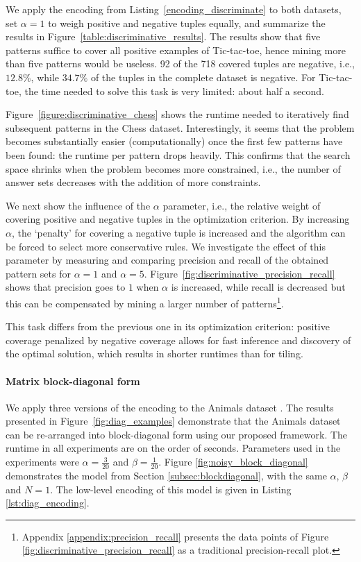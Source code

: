 We apply the encoding from Listing~\ref{encoding_discriminate} to both datasets, set $\alpha = 1$ to weigh positive and negative tuples equally, and summarize the results in Figure~\ref{table:discriminative_results}. The results show that five patterns suffice to cover all positive examples of Tic-tac-toe, hence mining more than five patterns would be useless. 92 of the 718 covered tuples are negative, i.e., $12.8\%$, while $34.7\%$ of the tuples in the complete dataset is negative. For Tic-tac-toe, the time needed to solve this task is very limited: about half a second.

Figure~\ref{figure:discriminative_chess} shows the runtime needed to iteratively find subsequent patterns in the Chess dataset. Interestingly, it seems that the problem becomes substantially easier (computationally) once the first few patterns have been found: the runtime per pattern drops heavily. This confirms that the search space shrinks when the problem becomes more constrained, i.e., the number of answer sets decreases with the addition of more constraints.

We next show the influence of the $\alpha$ parameter, i.e., the relative weight of covering positive and negative tuples in the optimization criterion. By increasing $\alpha$, the `penalty' for covering a negative tuple is increased and the algorithm can be forced to select more conservative rules. We investigate the effect of this parameter by measuring and comparing precision and recall of the obtained pattern sets for $\alpha = 1$ and $\alpha = 5$. Figure~\ref{fig:discriminative_precision_recall} shows that precision goes to $1$ when $\alpha$ is increased, while recall is decreased but this can be compensated by mining a larger number of patterns\footnote{\changesb Appendix \ref{appendix:precision_recall} presents the data points of Figure \ref{fig:discriminative_precision_recall} as a traditional precision-recall plot.\changese}.

This task differs from the previous one in its optimization criterion: positive coverage penalized by negative coverage allows for fast inference and discovery of the optimal solution, which results in shorter runtimes than for tiling. 

\paragraph{Matrix block-diagonal form}

We apply three versions of the encoding to the Animals dataset \citep{animalDataset}. The results presented in Figure~\ref{fig:diag_examples} demonstrate that the Animals dataset can be re-arranged into block-diagonal form using our proposed framework. The runtime in all experiments are on the order of seconds. Parameters used in the experiments were $\alpha=\frac{3}{20}$ and $\beta=\frac{1}{20}$. Figure \ref{fig:noisy_block_diagonal} demonstrates the model from Section \ref{subsec:blockdiagonal}, with the same $\alpha$, $\beta$ and $N=1$. The low-level encoding of this model is given in Listing \ref{lst:diag_encoding}.

